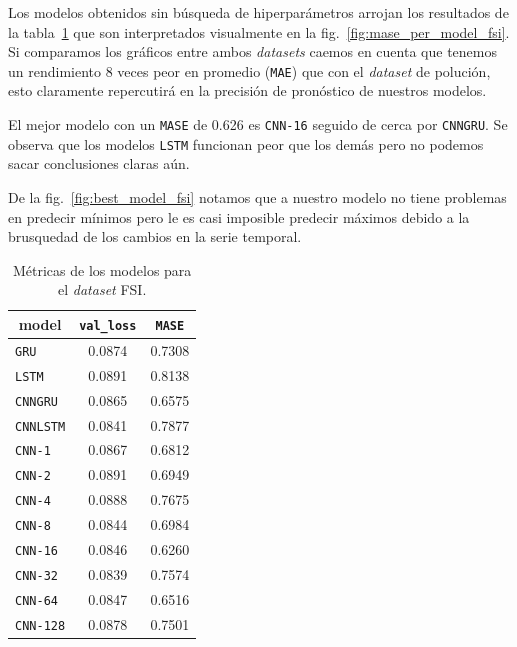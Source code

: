 \documentclass[a4paper,12pt]{article}
\begin{document}
Los modelos obtenidos sin búsqueda de hiperparámetros arrojan los resultados de la tabla~\ref{tab:score_table_fsi} que son interpretados visualmente en la fig.~\ref{fig:mase_per_model_fsi}. Si comparamos los gráficos entre ambos \textit{datasets} caemos en cuenta que tenemos un rendimiento 8 veces peor en promedio (\texttt{MAE}) que con el \textit{dataset} de polución, esto claramente repercutirá en la precisión de pronóstico de nuestros modelos.

El mejor modelo con un \texttt{MASE} de 0.626 es \texttt{CNN-16} seguido de cerca por \texttt{CNNGRU}. Se observa que los modelos \texttt{LSTM} funcionan peor que los demás pero no podemos sacar conclusiones claras aún.

De la fig.~\ref{fig:best_model_fsi} notamos que a nuestro modelo no tiene problemas en predecir mínimos pero le es casi imposible predecir máximos debido a la brusquedad de los cambios en la serie temporal.

\begin{table}[]
\centering
\begin{tabular}{lcc}
\hline
\multicolumn{1}{c}{{model}} & \multicolumn{1}{c}{\texttt{val\_loss}} & \multicolumn{1}{c}{\texttt{MASE}} \\ \hline
\texttt{GRU}     & 0.0874 & 0.7308 \\
\texttt{LSTM}    & 0.0891 & 0.8138 \\
\texttt{CNNGRU}  & 0.0865 & 0.6575 \\
\texttt{CNNLSTM} & 0.0841 & 0.7877 \\
\texttt{CNN-1}   & 0.0867 & 0.6812 \\
\texttt{CNN-2}   & 0.0891 & 0.6949 \\
\texttt{CNN-4}   & 0.0888 & 0.7675 \\
\texttt{CNN-8}   & 0.0844 & 0.6984 \\
\texttt{CNN-16}  & 0.0846 & 0.6260 \\
\texttt{CNN-32}  & 0.0839 & 0.7574 \\
\texttt{CNN-64}  & 0.0847 & 0.6516 \\
\texttt{CNN-128} & 0.0878 & 0.7501 \\ \hline
\end{tabular}
\caption{Métricas de los modelos para el \textit{dataset} FSI.}
\label{tab:score_table_fsi}
\end{table}
\end{document}
